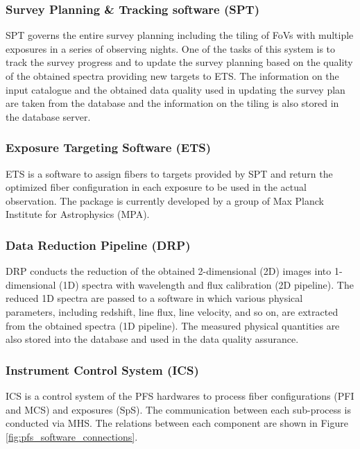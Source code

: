 \documentclass[a4paper]{article}
\begin{document}
\subsubsection{Survey Planning \& Tracking software (SPT)\label{sec:survey_operation:spt}}
SPT governs the entire survey planning including the tiling of FoVs with multiple exposures in a series of observing nights. One of the tasks of this system is to track the survey progress and to update the survey planning based on the quality of the obtained spectra providing new targets to ETS. The information on the input catalogue and the obtained data quality used in updating the survey plan are taken from the database and the information on the tiling is also stored in the database server.

\subsubsection{Exposure Targeting Software (ETS)\label{sec:survey_operation:ets}}
ETS is a software to assign fibers to targets provided by SPT and return the optimized fiber configuration in each exposure to be used in the actual observation. The package is currently developed by a group of Max Planck Institute for Astrophysics (MPA).

\subsubsection{Data Reduction Pipeline (DRP)\label{sec:survey_operation:drp}}
DRP conducts the reduction of the obtained 2-dimensional (2D) images into 1-dimensional (1D) spectra with wavelength and flux calibration (2D pipeline). The reduced 1D spectra are passed to a software in which various physical parameters, including redshift, line flux, line velocity, and so on, are extracted from the obtained spectra (1D pipeline). The measured physical quantities are also stored into the database and used in the data quality assurance.

\subsubsection{Instrument Control System (ICS)\label{sec:survey_operation:software}}
ICS is a control system of the PFS hardwares to process fiber configurations (PFI and MCS) and exposures (SpS). The communication between each sub-process is conducted via MHS. The relations between each component are shown in Figure \ref{fig:pfs_software_connections}. 
\end{document}
